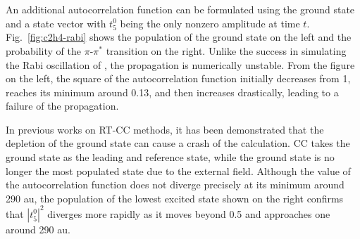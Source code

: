 An additional autocorrelation function can be formulated using the ground state and a state vector with $t_{5}^{0}$ being the only nonzero amplitude at time $t$. Fig.~\ref{fig:c2h4-rabi} shows the population of the ground state on the left and the probability of the $\pi$-$\pi^{*}$ transition on the right. Unlike the success in simulating the Rabi oscillation of , the propagation is numerically unstable. From the figure on the left, the square of the autocorrelation function initially decreases from 1, reaches its minimum around 0.13, and then increases drastically, leading to a failure of the propagation.

In previous works on RT-CC methods, it has been demonstrated that the depletion of the ground state can cause a crash of the calculation. CC takes the ground state as the leading and reference state, while the ground state is no longer the most populated state due to the external field.\cite{Kristiansen2020} Although the value of the autocorrelation function does not diverge precisely at its minimum around 290 au, the population of the lowest excited state shown on the right confirms that $|t_{5}^{0}|^{2}$ diverges more rapidly as it moves beyond 0.5 and approaches one around 290 au. 

